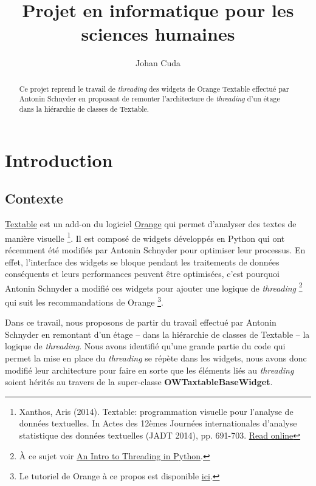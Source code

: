 \documentclass{article}
\title{Projet en informatique pour les sciences humaines}
\author{Johan Cuda}
\begin{document}
\maketitle

\begin{abstract}
Ce projet reprend le travail de \textit{threading} des widgets de Orange Textable effectué par Antonin Schnyder en proposant de remonter l'architecture de \textit{threading} d'un étage dans la hiérarchie de classes de Textable. 
\end{abstract}

\tableofcontents

\section{Introduction}

\subsection{Contexte}

\href{http://textable.io/}{Textable} est un add-on du logiciel \href{https://orangedatamining.com/}{Orange} qui permet d'analyser des textes de manière visuelle \footnote{Xanthos, Aris (2014). Textable: programmation visuelle pour l’analyse de données textuelles. In Actes des 12èmes Journées internationales d’analyse statistique des données textuelles (JADT 2014), pp. 691-703. \href{http://lexicometrica.univ-paris3.fr/jadt/jadt2014/01-ACTES/57-JADT2014.pdf}{Read online}}. Il est composé de widgets développés en Python qui ont récemment été modifiés par Antonin Schnyder pour optimiser leur processus. En effet, l'interface des widgets se bloque pendant les traitements de données conséquents et leurs performances peuvent être optimisées, c'est pourquoi Antonin Schnyder a modifié ces widgets pour ajouter une logique de \textit{threading} \footnote{À ce sujet voir \href{https://realpython.com/intro-to-python-threading/}{An Intro to Threading in Python}.} qui suit les recommandations de Orange \footnote{Le tutoriel de Orange à ce propos est disponible \href{https://orange3.readthedocs.io/projects/orange-development/en/latest/tutorial-responsive-gui.html}{ici}.}.\newline

Dans ce travail, nous proposons de partir du travail effectué par Antonin Schnyder en remontant d'un étage – dans la hiérarchie de classes de Textable – la logique de \textit{threading}. Nous avons identifié qu'une grande partie du code qui permet la mise en place du \textit{threading} se répète dans les widgets, nous avons donc modifié  leur architecture pour faire en sorte que les éléments liés au \textit{threading} soient hérités au travers de la super-classe \textbf{OWTaxtableBaseWidget}.
\newline
\end{document}
